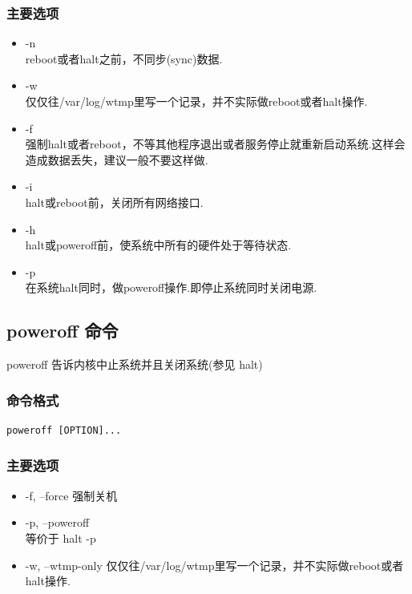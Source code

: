 \subsubsection{主要选项}

\begin{itemize}
\item
  -n\\ reboot或者halt之前，不同步(sync)数据.
\item
  -w\\ 仅仅往/var/log/wtmp里写一个记录，并不实际做reboot或者halt操作.
\item
  -f\\
  强制halt或者reboot，不等其他程序退出或者服务停止就重新启动系统.这样会造成数据丢失，建议一般不要这样做.
\item
  -i\\ halt或reboot前，关闭所有网络接口.
\item
  -h\\ halt或poweroff前，使系统中所有的硬件处于等待状态.
\item
  -p\\ 在系统halt同时，做poweroff操作.即停止系统同时关闭电源.
\end{itemize}
\subsection{poweroff 命令}

poweroff 告诉内核中止系统并且关闭系统(参见 halt)

\subsubsection{命令格式}

{\begin{shaded}\begin{verbatim}
poweroff [OPTION]...
\end{verbatim}\end{shaded}}
\subsubsection{主要选项}

\begin{itemize}
\item
  -f, --force 强制关机
\item
  -p, --poweroff\\ 等价于 halt -p
\item
  -w, --wtmp-only
  仅仅往/var/log/wtmp里写一个记录，并不实际做reboot或者halt操作.
\end{itemize}
